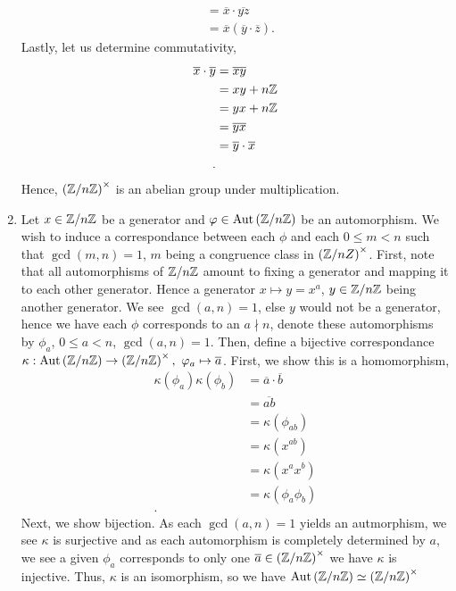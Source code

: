 \documentclass[a4paper]{article}
\begin{document}
\begin{solution}
\begin{enumerate}
\begin{align*}
				&= \overline{x} \cdot \overline{yz} \\
				&= \overline{x}\left( \overline{y} \cdot \overline{z} \right)
			.\end{align*}
			Lastly, let us determine commutativity,
			\begin{align*}
				\overline{x} \cdot \overline{y} &= \overline{xy}  \\
				&= xy + n\mathbb{Z} \\
				&= yx + n\mathbb{Z} \\
&= \overline{yx} \\
&= \overline{y} \cdot \overline{x} \\
			.\end{align*}
			Hence, \(\left( \mathbb{Z} /  n \mathbb{Z} \right) ^{ \times}\) is an abelian group under multiplication.
		\item Let \(x \in \mathbb{Z} / n\mathbb{Z}\) be a generator and \(\varphi \in \operatorname{Aut}\left( \mathbb{Z} / n\mathbb{Z} \right) \) be an automorphism. We wish to induce a correspondance between each \(\phi\) and each \(0 \le m < n\) such that \(\gcd\left( m, n \right)  = 1\), \(m\) being a congruence class in \(\left( \mathbb{Z} / nZ \right) ^{\times}\). First, note that all automorphisms of \(\mathbb{Z} / n\mathbb{Z}\) amount to fixing a generator and mapping it to each other generator. Hence a generator \(x \mapsto y = x^{a}\), \(y \in \mathbb{Z} / n\mathbb{Z}\) being another generator. We see \(\gcd\left( a, n \right)  = 1\), else \(y\) would not be a generator, hence we have each \(\phi\) corresponds to an \(a \nmid n\), denote these automorphisms by \(\phi_{a}\), \(0 \le a < n\), \(\gcd\left( a, n \right)  = 1\). Then, define a bijective correspondance \(\kappa : \operatorname{Aut}\left( \mathbb{Z} / n\mathbb{Z} \right)  \to \left( \mathbb{Z} / n\mathbb{Z} \right) ^{\times}, \ \varphi_{a} \mapsto \overline{a}\). First, we show this is a homomorphism,
			\begin{align*}
				\kappa\left( \phi_{a} \right) \kappa\left( \phi_{b} \right)  &= \overline{a} \cdot \overline{b}\\
				&= \overline{ab} \\
				&= \kappa\left( \phi_{ab} \right)  \\
				&= \kappa\left( x^{ab} \right)  \\
				&= \kappa\left( x^{a}x^{b} \right)  \\
				&= \kappa\left( \phi_{a}\phi_{b} \right)  \\
			.\end{align*}Next, we show bijection. As each \(\gcd\left( a, n \right) = 1\) yields an autmorphism, we see \(\kappa\) is surjective and as each automorphism is completely determined by \(a\), we see a given \(\phi_{a}\) corresponds to only one \(\overline{a} \in \left( \mathbb{Z} / n\mathbb{Z} \right) ^{\times}\) we have \(\kappa\) is injective. Thus, \(\kappa\) is an isomorphism, so we have \(\operatorname{Aut}\left( \mathbb{Z} / n\mathbb{Z} \right) \simeq \left( \mathbb{Z} / n\mathbb{Z} \right) ^{\times}\)
\end{enumerate}
\end{solution}
\end{document}
